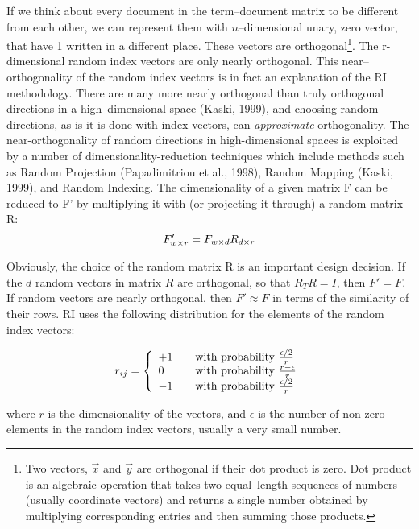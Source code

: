 If we think about every document in the term--document matrix to be different from each other,
we can represent them with $n$--dimensional unary, zero vector, that have 1 written in a different place. 
These vectors are orthogonal\footnote{Two vectors, $\vec x$ and $\vec y$ are orthogonal if their dot product is zero. Dot product is an algebraic operation that takes two equal--length sequences of numbers (usually coordinate vectors) and returns a single number obtained by multiplying corresponding entries and then summing those products.}. 
The r-dimensional random index vectors are only nearly orthogonal. This near--orthogonality of the
 random index vectors is in fact an explanation of the RI methodology. There are many more
 nearly orthogonal than truly orthogonal directions in a high--dimensional space (Kaski, 1999)\cite{kaski1999}, and 
choosing  random directions, as is it is done with index vectors, can \textit{approximate} orthogonality.
The near-orthogonality of random directions in high-dimensional spaces is exploited
by a number of dimensionality-reduction techniques which include methods
such as Random Projection (Papadimitriou et al., 1998)\cite{papadim1998}, Random Mapping (Kaski, 1999)\cite{kaski1999},
 and Random Indexing.
The dimensionality of a given matrix F can be reduced to F' by multiplying it with (or projecting it through) a random matrix R:
\begin{equation}
\large{
F'_{w \times r} = F_{w \times d}R_{d \times r}
}
\end{equation}

Obviously, the choice of the random matrix R is an important design decision. If the $d$ random vectors 
in matrix $R$ are orthogonal, so that $R_{T}R= I$, then $F' = F$. If random vectors are nearly 
orthogonal, then $F'\approx F$ in terms of the similarity of their rows. RI uses the following distribution
for the elements of the random index vectors:
\begin{center}
\begin{equation}
 r_{ij} = \left\{ 
\begin{array}{l l} 
    +1 & \quad \textrm{with probability $\frac{\epsilon/2}{r}$}\\
      0  & \quad \textrm{with probability $\frac{r-\epsilon}{r}$}\\
    -1 & \quad \textrm{with probability $\frac{\epsilon/2}{r}$}\\
  \end{array} \right.
\end{equation}
\end{center}
where $r$ is the dimensionality of the vectors, and $\epsilon$ is the number of non-zero
elements in the random index vectors, usually a very small number.

